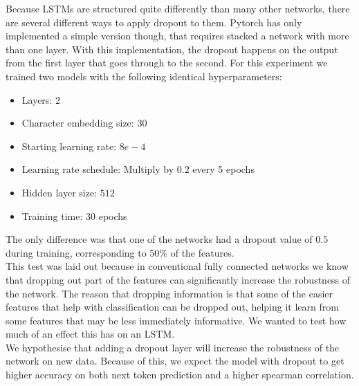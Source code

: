 Because LSTMs are structured quite differently than many other networks, there are several different ways to apply dropout to them.\cite{dropout} Pytorch has only implemented a simple version though, that requires stacked a network with more than one layer. With this implementation, the dropout happens on the output from the first layer that goes through to the second. For this experiment we trained two models with the following identical hyperparameters:
\begin{itemize}
	\item Layers: $2$
	\item Character embedding size: 30
	\item Starting learning rate: $8e-4$
	\item Learning rate schedule: Multiply by $0.2$ every 5 epochs
	\item Hidden layer size: $512$
	\item Training time: 30 epochs
\end{itemize}
The only difference was that one of the networks had a dropout value of $0.5$ during training, corresponding to $50\%$ of the features.\\

\noindent
This test was laid out because in conventional fully connected networks we know that dropping out part of the features can significantly increase the robustness of the network. The reason that dropping information is that some of the easier features that help with classification can be dropped out, helping it learn from some features that may be less immediately informative. We wanted to test how much of an effect this has on an LSTM.\\

\noindent
We hypothesise that adding a dropout layer will increase the robustness of the network on new data. Because of this, we expect the model with dropout to get higher accuracy on both next token prediction and a higher spearman correlation.

%
